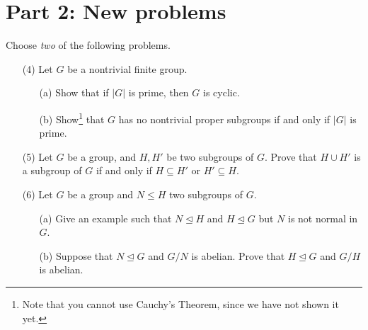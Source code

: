 \documentclass[11pt]{article}
\theoremstyle{definition}
\begin{document}
\section*{Part 2: New problems}

Choose \emph{two} of the following problems.

\begin{enumerate}
 
 \item[(4)] Let $G$ be a nontrivial finite group. 
 \begin{enumerate}
 \item[(a)] Show that if $|G|$ is prime, then $G$ is cyclic.
 \item[(b)] Show\footnote{Note that you cannot use Cauchy's Theorem, since we have not shown it yet.}  that $G$ has no nontrivial proper subgroups if and only if $|G|$ is prime. 
  \end{enumerate}


\item[(5)] Let $G$ be a group, and $H, H'$ be two subgroups of $G$. Prove that $H\cup H'$ is a subgroup of $G$ if and only if $H\subseteq H'$ or $H' \subseteq H$.


\item[(6)] Let $G$ be a group and $N\leq H$ two subgroups of $G$.
\begin{enumerate}
\item[(a)] Give an example such that $N\trianglelefteq H$ and $H\trianglelefteq G$ but $N$ is not normal in $G$.
\item[(b)] Suppose that $N\trianglelefteq G$ and $G/N$ is abelian. Prove that $H \trianglelefteq G$ and $G/H$ is abelian. 
\end{enumerate}

\end{enumerate}
\end{document}
